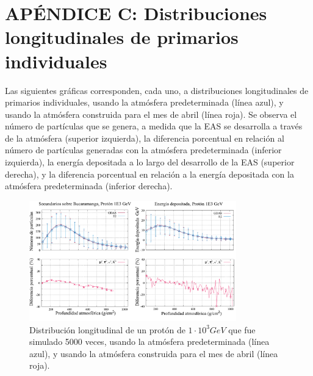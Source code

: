 \newpage
\chapter{APÉNDICE C: Distribuciones longitudinales de primarios individuales}
\label{sec:apendiceC}


Las siguientes gráficas corresponden, cada uno, a distribuciones longitudinales de primarios individuales, usando la atmósfera predeterminada (línea azul), y usando la atmósfera construida para el mes de abril (línea roja). Se observa el número de partículas que se genera, a medida que la EAS se desarrolla a través de la atmósfera (superior izquierda), la diferencia porcentual en relación al número de partículas generadas con la atmósfera predeterminada (inferior izquierda), la energía depositada a lo largo del desarrollo de la EAS (superior derecha), y la diferencia porcentual en relación a la energía depositada con la atmósfera predeterminada (inferior derecha).

\begin{figure}[htb!]
\centering
\includegraphics[width=0.8\textwidth]{images/proton_1E3.pdf}
\caption[Distribución longitudinal de un protón de $1\cdot 10^{3}$ GeV.]{Distribución longitudinal de un protón de $1\cdot 10^{3} GeV$ que fue simulado 5000 veces, usando la atmósfera predeterminada (línea azul), y usando la atmósfera construida para el mes de abril (línea roja).}
\label{fig:fig26}
\end{figure}

